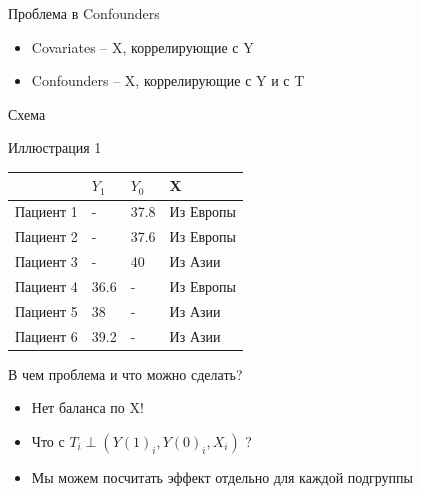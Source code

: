 \begin{frame}{Проблема в Confounders}
\begin{itemize}
   \item Covariates -- X, коррелирующие с Y
   \item Confounders -- X, коррелирующие с Y и с T
\end{itemize}

Схема

\end{frame} 


\begin{frame}{Иллюстрация 1}
\begin{table}[]
\begin{tabular}{l|l|l||l}
&$Y_1$ & $Y_0$ & X \\
\hline
Пациент 1 & - & 37.8 & Из Европы \\
Пациент 2 & - & 37.6 & Из Европы  \\
Пациент 3 & - & 40 & Из Азии  \\
Пациент 4 & 36.6 & - & Из Европы  \\
Пациент 5 &38   & - &  Из Азии \\
Пациент 6 &39.2 & - & Из Азии
\end{tabular}
\end{table}

В чем проблема и что можно сделать?
\begin{itemize}[<+->]
        \item Нет баланса по X!
        \item Что с $T_i \perp (Y(1)_i, Y(0)_i, X_i)$ ?
        \item Мы можем посчитать эффект отдельно для каждой подгруппы
\end{itemize}
\end{frame} 


